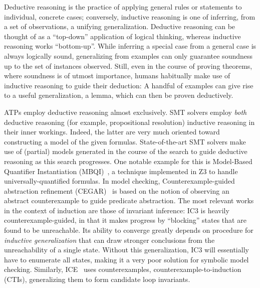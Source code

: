 Deductive reasoning is the practice of applying general rules or statements to
individual, concrete cases; conversely, inductive reasoning is one of inferring,
from a set of observations, a unifying generalization.
Deductive reasoning can be thought of as a ``top-down'' application of logical
thinking, whereas inductive reasoning works ``bottom-up''.
While inferring a special case from a general case is always logically sound,
generalizing from examples can only guarantee soundness up to the set of
instances observed.
Still, even in the course of proving theorems, where soundness is of utmost
importance, humans habitually make use of inductive reasoning to guide their
deduction:
A handful of examples can give rise to a useful generalization, a lemma,
which can then be proven deductively.

ATPs employ deductive reasoning almost exclusively.
SMT solvers employ \emph{both} deductive reasoning (for example, propositional resolution) inductive reasoning in their inner workings.
Indeed, the latter are very much oriented toward constructing a model of the given formulas.
State-of-the-art SMT solvers make use of (partial) models generated in the
course of the search to guide deductive reasoning as this search progresses.
One notable example for this is Model-Based Quantifier Instantiation (MBQI)~\cite{MBQI},
a technique implemented in Z3 to handle universally-quantified formulas.
In model checking, Counterexample-guided abstraction refinement (CEGAR)~\cite{cegar} is based on the notion of observing an abstract counterexample to guide predicate abstraction.
The most relevant works in the context of induction are those of invariant inference:
IC3 is heavily counterexample-guided, in that it makes progress by ``blocking'' states that are found to be unreachable.
Its ability to converge greatly depends on procedure for \emph{inductive generalization} that can draw stronger conclusions from the unreachability of a single state.
Without this generalization, IC3 will essentially have to enumerate all states, making it a very poor solution for symbolic model checking.
Similarly, ICE~\cite{CAV2014:Pranav} uses counterexamples, \esp counterexample-to-induction (CTIs), generalizing them to form candidate loop invariants.

